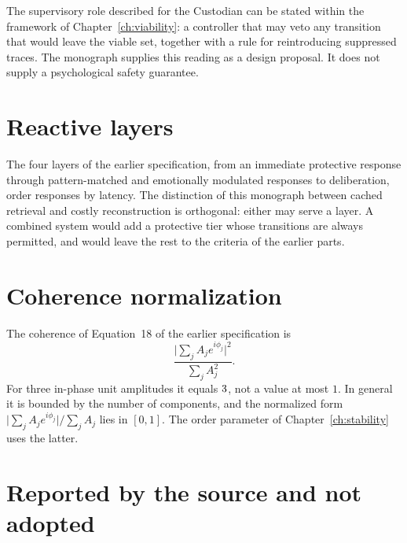 The supervisory role described for the Custodian can be stated within the framework of Chapter~\ref{ch:viability}: a controller that may veto any transition that would leave the viable set, together with a rule for reintroducing suppressed traces. The monograph supplies this reading as a design proposal. It does not supply a psychological safety guarantee.

\section{Reactive layers}\label{sec:july-layers}

The four layers of the earlier specification, from an immediate protective response through pattern-matched and emotionally modulated responses to deliberation, order responses by latency. The distinction of this monograph between cached retrieval and costly reconstruction is orthogonal: either may serve a layer. A combined system would add a protective tier whose transitions are always permitted, and would leave the rest to the criteria of the earlier parts.

\section{Coherence normalization}

\begin{counterex}\label{cex:coherence}
The coherence of Equation~18 of the earlier specification is
\[\frac{\bigl|\sum_jA_je^{i\phi_j}\bigr|^2}{\sum_jA_j^2}.\]
For three in-phase unit amplitudes it equals $3{}$, not a value at most $1$. In general it is bounded by the number of components, and the normalized form $\bigl|\sum_jA_je^{i\phi_j}\bigr|\big/\sum_jA_j$ lies in $[0,1]$. The order parameter of Chapter~\ref{ch:stability} uses the latter.
\end{counterex}

\section{Reported by the source and not adopted}


